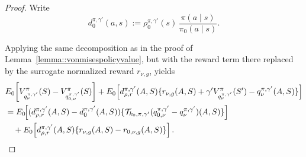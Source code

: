 \documentclass[11pt]{article}
\theoremstyle{plain}
\begin{document}
\begin{proof}
Write
\[
d_0^{\pi,\gamma'}(a,s)
:= \rho_0^{\pi,\gamma'}(s)\,\frac{\pi(a \mid s)}{\pi_0(a \mid s)}.
\]

Applying the same decomposition as in the proof of
Lemma~\ref{lemma::vonmisespolicyvalue}, but with the reward term there replaced
by the surrogate normalized reward \(r_{\nu,g}\), yields
\begin{align} 
& E_0\!\left[V_{q_{\nu}^{\pi,\gamma'}}^\pi(S) - V_{q_{0,\nu}^{\pi,\gamma'}}^\pi(S)\right] 
+ E_0\!\left[d_{\rho,r}^{\pi,\gamma'}(A,S)\{r_{\nu,g}(A,S) + \gamma' V_{q_{\nu}^{\pi,\gamma'}}^\pi(S') - q_{\nu}^{\pi,\gamma'}(A,S)\}\right] \notag \\
&= E_0\!\Big[(d_{\rho,r}^{\pi,\gamma'}(A,S) - d_0^{\pi,\gamma'}(A,S))\{\mathcal{T}_{k_0, \pi, \gamma'}(q_{0,\nu}^{\pi,\gamma'} - q_{\nu}^{\pi,\gamma'})(A,S)\}\Big]  \notag \\
&\quad + E_0\!\left[d_{\rho,r}^{\pi,\gamma'}(A,S)\{r_{\nu,g}(A,S) - r_{0,\nu,g}(A,S)\}\right]. \label{eqn::nuproofstart}
\end{align}
 

\end{proof}
\end{document}
